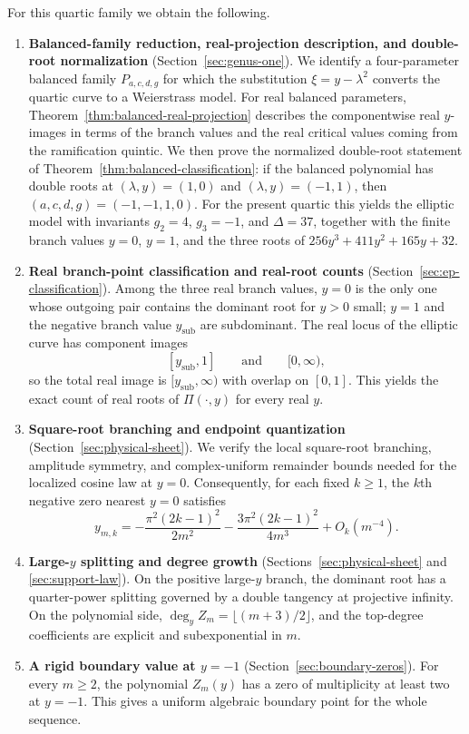 For this quartic family we obtain the following.

\begin{enumerate}
\item \textbf{Balanced-family reduction, real-projection description, and double-root normalization} (Section~\ref{sec:genus-one}).
We identify a four-parameter balanced family \(P_{a,c,d,g}\) for which the substitution \(\xi=y-\lambda^2\) converts the quartic curve to a Weierstrass model.
For real balanced parameters, Theorem~\ref{thm:balanced-real-projection} describes the componentwise real \(y\)-images in terms of the branch values and the real critical values coming from the ramification quintic.
We then prove the normalized double-root statement of Theorem~\ref{thm:balanced-classification}: if the balanced polynomial has double roots at $(\lambda,y)=(1,0)$ and $(\lambda,y)=(-1,1)$, then \((a,c,d,g)=(-1,-1,1,0)\).
For the present quartic this yields the elliptic model with invariants \(g_2=4\), \(g_3=-1\), and \(\Delta=37\), together with the finite branch values \(y=0\), \(y=1\), and the three roots of \(256y^3+411y^2+165y+32\).

\item \textbf{Real branch-point classification and real-root counts} (Section~\ref{sec:ep-classification}).
Among the three real branch values, $y=0$ is the only one whose outgoing pair contains the dominant root for $y>0$ small; $y=1$ and the negative branch value \(y_{\mathrm{sub}}\) are subdominant.
The real locus of the elliptic curve has component images
\[
[y_{\mathrm{sub}},1]
\qquad\text{and}\qquad
[0,\infty),
\]
so the total real image is \( [y_{\mathrm{sub}},\infty) \) with overlap on \([0,1]\).
This yields the exact count of real roots of \(\Pi(\cdot,y)\) for every real \(y\).

\item \textbf{Square-root branching and endpoint quantization} (Section~\ref{sec:physical-sheet}).
We verify the local square-root branching, amplitude symmetry, and complex-uniform remainder bounds needed for the localized cosine law at \(y=0\).
Consequently, for each fixed \(k\ge 1\), the \(k\)th negative zero nearest \(y=0\) satisfies
\[
y_{m,k}
=
-\frac{\pi^2(2k-1)^2}{2m^2}
-\frac{3\pi^2(2k-1)^2}{4m^3}
+O_k(m^{-4}).
\]

\item \textbf{Large-$y$ splitting and degree growth} (Sections~\ref{sec:physical-sheet} and \ref{sec:support-law}).
On the positive large-$y$ branch, the dominant root has a quarter-power splitting governed by a double tangency at projective infinity.
On the polynomial side, \(\deg_y Z_m=\lfloor(m+3)/2\rfloor\), and the top-degree coefficients are explicit and subexponential in \(m\).

\item \textbf{A rigid boundary value at \(y=-1\)} (Section~\ref{sec:boundary-zeros}).
For every \(m\ge 2\), the polynomial \(Z_m(y)\) has a zero of multiplicity at least two at \(y=-1\).
This gives a uniform algebraic boundary point for the whole sequence.
\end{enumerate}

